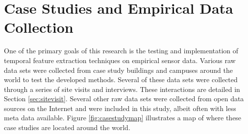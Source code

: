 \section{Case Studies and Empirical Data Collection}
\label{sec:casestudies}

One of the primary goals of this research is the testing and implementation of temporal feature extraction techniques on empirical sensor data. Various raw data sets were collected from case study buildings and campuses around the world to test the developed methods. Several of these data sets were collected through a series of site visits and interviews. These interactions are detailed in Section \ref{sec:sitevisit}. Several other raw data sets were collected from open data sources on the Internet and were included in this study, albeit often with less meta data available. Figure \ref{fig:casestudymap} illustrates a map of where these case studies are located around the world.